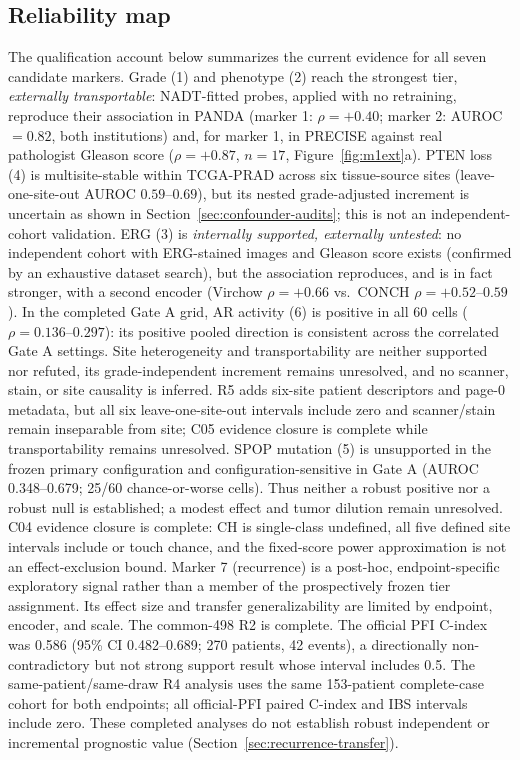 \label{sec:core-results}

\subsection{Reliability map}

The qualification account below summarizes the current evidence for all seven
candidate markers. Grade (1) and phenotype (2) reach the strongest tier, \emph{externally
transportable}: NADT-fitted probes, applied with no retraining, reproduce their association in
PANDA (marker 1: $\rho=+0.40$; marker 2: AUROC$=0.82$, both institutions) and, for marker 1, in
PRECISE against real pathologist Gleason score ($\rho=+0.87$, $n=17$, Figure~\ref{fig:m1ext}a).
PTEN loss (4) is multisite-stable within TCGA-PRAD across six tissue-source sites
(leave-one-site-out AUROC $0.59$--$0.69$), but its nested grade-adjusted increment is uncertain
as shown in Section~\ref{sec:confounder-audits}; this is not an independent-cohort validation.
ERG (3) is \emph{internally supported, externally untested}: no independent cohort with
ERG-stained images and Gleason score exists (confirmed by an exhaustive dataset search), but
the association reproduces, and is in fact stronger, with a second encoder (Virchow
$\rho=+0.66$ vs.\ CONCH $\rho=+0.52$--$0.59$). In the completed Gate A grid, AR activity
(6) is positive in all 60 cells ($\rho=0.136$--$0.297$): its positive pooled direction is
consistent across the correlated Gate A settings. Site heterogeneity and transportability are
neither supported nor refuted, its grade-independent increment remains unresolved, and no
scanner, stain, or site causality is inferred. R5 adds six-site patient descriptors and
page-0 metadata, but all six leave-one-site-out intervals include zero and scanner/stain remain
inseparable from site; C05 evidence closure is complete while transportability remains
unresolved. SPOP
mutation (5) is unsupported in the frozen primary configuration and configuration-sensitive
in Gate A (AUROC 0.348--0.679; 25/60 chance-or-worse cells). Thus neither a robust positive nor
a robust null is established; a modest effect and tumor dilution remain unresolved. C04
evidence closure is complete: CH is single-class undefined, all five defined site intervals
include or touch chance, and the fixed-score power approximation is not an effect-exclusion
bound. Marker 7 (recurrence) is a post-hoc, endpoint-specific
exploratory signal rather than a member of the prospectively frozen tier assignment. Its
effect size and transfer generalizability are limited by endpoint, encoder, and scale. The
common-498 R2 is complete. The official PFI C-index was 0.586 (95\% CI 0.482--0.689; 270
patients, 42 events), a directionally non-contradictory but not strong support result whose
interval includes 0.5. The same-patient/same-draw R4 analysis uses the same 153-patient
complete-case cohort for both endpoints; all official-PFI paired C-index and IBS intervals
include zero. These completed analyses do not establish robust independent or incremental
prognostic value (Section~\ref{sec:recurrence-transfer}).

